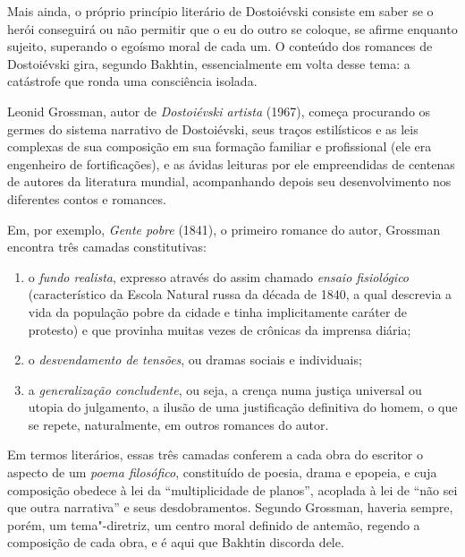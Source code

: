 Mais ainda, o próprio princípio literário de Dostoiévski consiste em
saber se o herói conseguirá ou não permitir que o eu do outro se
coloque, se afirme enquanto sujeito, superando o egoísmo moral de cada
um. O conteúdo dos romances de Dostoiévski gira, segundo Bakhtin,
essencialmente em volta desse tema: a catástrofe que ronda uma
consciência isolada.

Leonid Grossman, autor de \emph{Dostoiévski artista} (1967), começa
procurando os germes do sistema narrativo de Dostoiévski, seus traços
estilísticos e as leis complexas de sua composição em sua formação
familiar e profissional (ele era engenheiro de fortificações), e as
ávidas leituras por ele empreendidas de centenas de autores da
literatura mundial, acompanhando depois seu desenvolvi­mento nos
diferentes contos e romances.

Em, por exemplo, \emph{Gente pobre} (1841), o primeiro romance do autor,
Grossman encontra três camadas constitutivas:

\begin{enumerate}
\item o \emph{fundo
realista}, expresso através do assim chamado \emph{ensaio fisiológico}
(característico da Escola Natural russa da década de 1840, a qual descrevia
a vida da população pobre da cidade e tinha implicitamente caráter de
protesto) e que provi­nha muitas vezes de crônicas da imprensa diária;
\item o \emph{desvendamento de tensões}, ou dramas sociais e individuais;
\item a \emph{generalização concludente}, ou seja, a crença numa justiça
universal ou utopia do julgamento, a ilusão de uma justificação
definitiva do homem, o que se repete, natural­mente, em outros romances
do autor.
\end{enumerate}

Em termos literários, essas três camadas confe­rem a cada obra do
escritor o aspecto de um \emph{poema filosófico}, constituído de poesia,
drama e epopeia, e cuja composição obedece à lei da ``multiplicidade de
planos'', acoplada à lei de ``não sei que outra narrativa'' e seus
desdobramentos. Segundo Grossman, haveria sempre, porém, um
tema"-diretriz, um centro moral definido de antemão, regendo a composição
de cada obra, e é aqui que Bakhtin discorda dele.

